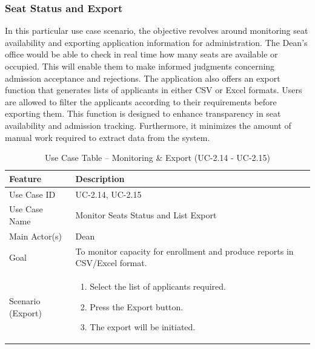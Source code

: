 \subsubsection{Seat Status and Export}

In this particular use case scenario, the objective revolves around monitoring seat availability and exporting application information for administration.
The Dean’s office would be able to check in real time how many seats are available or occupied. 
This will enable them to make informed judgments concerning admission acceptance and rejections. 
The application also offers an export function that generates lists of applicants in either CSV or Excel formats. 
Users are allowed to filter the applicants according to their requirements before exporting them. 
This function is designed to enhance transparency in seat availability and admission tracking. 
Furthermore, it minimizes the amount of manual work required to extract data from the system.

\begin{table}[H]
    \centering
    \small
    \renewcommand{\arraystretch}{1.4}
    \caption{Use Case Table – Monitoring \& Export (UC-2.14 - UC-2.15)}
    \label{tab:monitoring_export}
    
    \begin{tabularx}{\textwidth}{|l|X|}
        \hline
        \rowcolor[gray]{0.9} {Feature} & {Description} \\ \hline
        Use Case ID & UC-2.14, UC-2.15 \\ \hline
        Use Case Name & Monitor Seats Status and List Export \\ \hline
        Main Actor(s) & Dean \\ \hline
        Goal & To monitor capacity for enrollment and produce reports in CSV/Excel format. \\ \hline
        Scenario (Export) & 
        \begin{enumerate}[nosep, leftmargin=*]
            \item Select the list of applicants required.
            \item Press the Export button.
            \item The export will be initiated.
        \end{enumerate} \\ \hline
    \end{tabularx}
\end{table}
\FloatBarrier